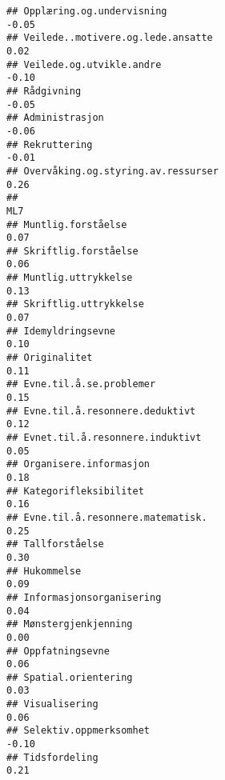 \documentclass[
]{article}
\begin{document}
\begin{verbatim}
## Opplæring.og.undervisning                                                        -0.05
## Veilede..motivere.og.lede.ansatte                                                 0.02
## Veilede.og.utvikle.andre                                                         -0.10
## Rådgivning                                                                       -0.05
## Administrasjon                                                                   -0.06
## Rekruttering                                                                     -0.01
## Overvåking.og.styring.av.ressurser                                                0.26
##                                                                                    ML7
## Muntlig.forståelse                                                                0.07
## Skriftlig.forståelse                                                              0.06
## Muntlig.uttrykkelse                                                               0.13
## Skriftlig.uttrykkelse                                                             0.07
## Idemyldringsevne                                                                  0.10
## Originalitet                                                                      0.11
## Evne.til.å.se.problemer                                                           0.15
## Evne.til.å.resonnere.deduktivt                                                    0.12
## Evnet.til.å.resonnere.induktivt                                                   0.05
## Organisere.informasjon                                                            0.18
## Kategorifleksibilitet                                                             0.16
## Evne.til.å.resonnere.matematisk.                                                  0.25
## Tallforståelse                                                                    0.30
## Hukommelse                                                                        0.09
## Informasjonsorganisering                                                          0.04
## Mønstergjenkjenning                                                               0.00
## Oppfatningsevne                                                                   0.06
## Spatial.orientering                                                               0.03
## Visualisering                                                                     0.06
## Selektiv.oppmerksomhet                                                           -0.10
## Tidsfordeling                                                                     0.21

\end{verbatim}
\end{document}
